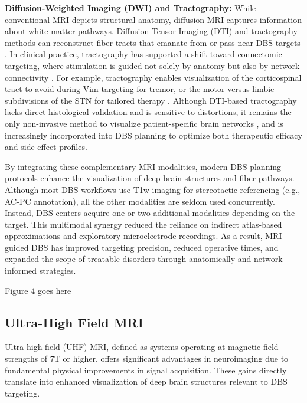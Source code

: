\textbf{Diffusion-Weighted Imaging (DWI) and Tractography:} While conventional MRI depicts structural anatomy, diffusion MRI captures information about white matter pathways. Diffusion Tensor Imaging (DTI) and tractography methods can reconstruct fiber tracts that emanate from or pass near DBS targets \cite{Rodrigues2018-jt}. In clinical practice, tractography has supported a shift toward connectomic targeting, where stimulation is guided not solely by anatomy but also by network connectivity \cite{Horn2020-wf}. For example, tractography enables visualization of the corticospinal tract to avoid during Vim targeting for tremor, or the motor versus limbic subdivisions of the STN for tailored therapy \cite{Calabrese2016-xi}. Although DTI-based tractography lacks direct histological validation and is sensitive to distortions, it remains the only non-invasive method to visualize patient-specific brain networks \cite{Coenen2016-pd}, and is increasingly incorporated into DBS planning to optimize both therapeutic efficacy and side effect profiles.

By integrating these complementary MRI modalities, modern DBS planning protocols enhance the visualization of deep brain structures and fiber pathways. Although most DBS workflows use T1w imaging for stereotactic referencing (e.g., AC-PC annotation), all the other modalities are seldom used concurrently. Instead, DBS centers acquire one or two additional modalities depending on the target. This multimodal synergy reduced the reliance on indirect atlas-based approximations and exploratory microelectrode recordings. As a result, MRI-guided DBS has improved targeting precision, reduced operative times, and expanded the scope of treatable disorders through anatomically and network-informed strategies.

Figure 4 goes here

\subsection{Ultra-High Field MRI}
\label{sec:uhf_mri_physics}

Ultra-high field (UHF) MRI, defined as systems operating at magnetic field strengths of 7T or higher, offers significant advantages in neuroimaging due to fundamental physical improvements in signal acquisition. These gains directly translate into enhanced visualization of deep brain structures relevant to DBS targeting.

